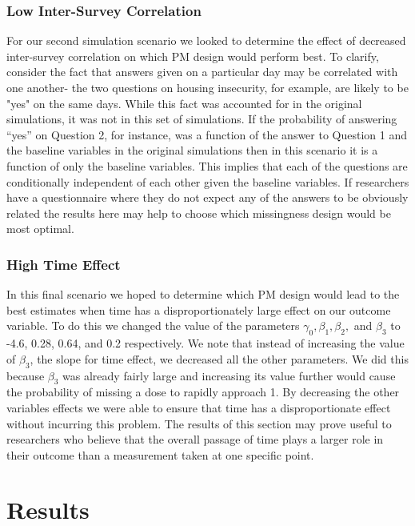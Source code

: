\documentclass{svjour3}                     %
\begin{document}
\subsubsection{Low Inter-Survey Correlation}
For our second simulation scenario we looked to determine the effect of decreased inter-survey correlation on which PM design would perform best. To clarify, consider the fact that answers given on a particular day may be correlated with one another- the two questions on housing insecurity, for example, are likely to be "yes" on the same days. While this fact was accounted for in the original simulations, it was not in this set of simulations. If the probability of answering “yes” on Question 2, for instance, was a function of the answer to Question 1 and the baseline variables in the original simulations then in this scenario it is a function of only the baseline variables. This implies that each of the questions are conditionally independent of each other given the baseline variables. If researchers have a questionnaire where they do not expect any of the answers to be obviously related the results here may help to choose which missingness design would be most optimal. \par
\subsubsection{High Time Effect}
In this final scenario we hoped to determine which PM design would lead to the best estimates when time has a disproportionately large effect on our outcome variable. To do this we changed the value of the parameters $\gamma_0, \beta_1, \beta_2,$ and $\beta_3$ to -4.6, 0.28, 0.64, and 0.2 respectively. We note that instead of increasing the value of $\beta_3$, the slope for time effect, we decreased all the other parameters. We did this because $\beta_3$ was already fairly large and increasing its value further would cause the probability of missing a dose to rapidly approach 1. By decreasing the other variables effects we were able to ensure that time has a disproportionate effect without incurring this problem. The results of this section may prove useful to researchers who believe that the overall passage of time plays a larger role in their outcome than a measurement taken at one specific point. \par

\section{Results}
\label{sec:3}
\end{document}
